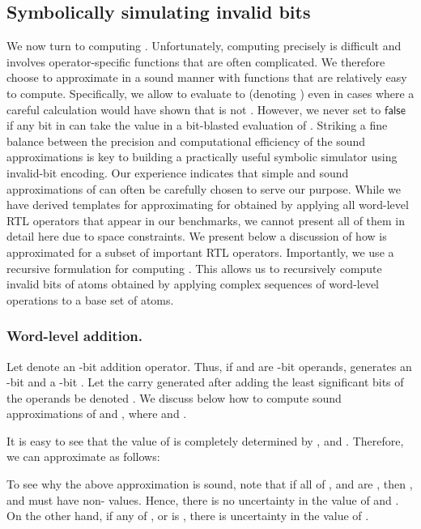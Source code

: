 \documentclass{llncs}
\newcommand{\false}{\ensuremath{\mathsf{false}}}
\begin{document}
\subsection{Symbolically simulating invalid bits}\label{subsec:sim-inv}
We now turn to computing .  Unfortunately, computing
 precisely is difficult and involves
operator-specific functions that are often complicated.  We therefore
choose to approximate  in a sound manner with
functions that are relatively easy to compute.  Specifically, we allow
 to evaluate to  (denoting ) even in cases where a careful calculation would have
shown that  is not .
However, we never set  to {\false} if any bit in
 can take the value  in a bit-blasted evaluation of
.  
Striking a fine balance between the precision and computational
efficiency of the sound approximations is key to building a
practically useful symbolic simulator using invalid-bit encoding.  Our
experience indicates that simple and sound approximations of
 can often be carefully chosen to serve our purpose.
While we have derived templates for approximating 
for  obtained by applying all word-level RTL operators that
appear in our benchmarks, we cannot present all of them in detail here
due to space constraints.  We present below a discussion of how
 is approximated for a subset of important RTL
operators.  Importantly, we use a recursive formulation for computing
.  This allows us to recursively compute
invalid bits of atoms obtained by applying complex sequences of
word-level operations to a base set of atoms.  

\subsubsection{Word-level addition.} Let  denote an
-bit addition operator.  Thus, if  and  are -bit operands,
 generates an -bit  and a -bit .  Let the
carry generated after adding the least significant  bits of the
operands be denoted .  We discuss below how to compute
sound approximations of  and
, where  and .

It is easy to see that the value of  is completely
determined by ,  and .  Therefore, we can
approximate  as follows:


To see why the above approximation is sound, note that if
all of ,  and  are
, then ,  and  must have
non- values.  Hence, there is no uncertainty in the value
of  and .  On the other hand, if
any of ,  or  is
, there is uncertainty in the value of .
\end{document}
